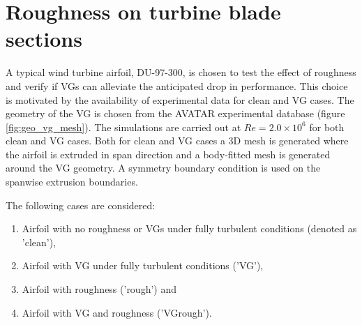 \section{Roughness on turbine blade sections}\label{sec:du97}
A typical wind turbine airfoil, DU-97-300, is chosen to test the effect of roughness and verify if VGs can alleviate the anticipated drop in performance. This choice is motivated by the availability of experimental data for clean and VG cases. The geometry of the VG is chosen from the AVATAR experimental database (figure \ref{fig:geo_vg_mesh})\cite{Schepers_2018,baldacchino2018experimental}. The simulations are carried out at $Re=2.0\times10^6$ for both clean and VG cases. Both for clean and VG cases a 3D mesh is generated where the airfoil is extruded in span direction and a body-fitted mesh is generated around the VG geometry. A symmetry boundary condition is used on the spanwise extrusion boundaries.

The following cases are considered:
\begin{enumerate}
    \item Airfoil with no roughness or VGs under fully turbulent conditions (denoted as 'clean'),
    \item Airfoil with VG under fully turbulent conditions ('VG'),
    \item Airfoil with roughness ('rough') and
    \item Airfoil with VG and roughness ('VGrough').
\end{enumerate} 

